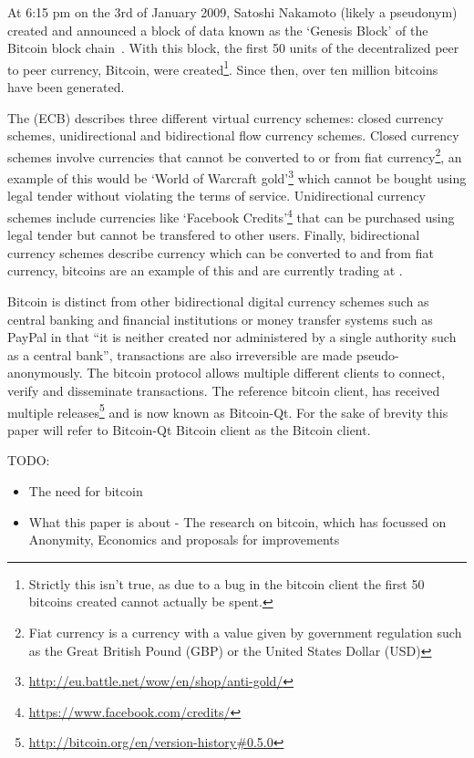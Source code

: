 At 6:15 pm on the 3rd of January 2009, Satoshi Nakamoto (likely a pseudonym) created and announced a block of data known as the `Genesis Block' of the Bitcoin block chain~\cite{satoshi}. With this block, the first 50 units of the decentralized peer to peer currency, Bitcoin, were created\footnote{Strictly this isn't true, as due to a bug in the bitcoin client the first 50 bitcoins created cannot actually be spent.}. Since then, over ten million bitcoins have been generated.

The \textcite{euro-currency-schemes} (ECB) describes three different virtual currency schemes: closed currency schemes, unidirectional and bidirectional flow currency schemes.  Closed currency schemes involve currencies that cannot be converted to or from fiat currency\footnote{Fiat currency is a currency with a value given by government regulation such as the Great British Pound (GBP) or the United States Dollar (USD)}, an example of this would be `World of Warcraft gold'\footnote{\url{http://eu.battle.net/wow/en/shop/anti-gold/}} which cannot be bought using legal tender without violating the terms of service.  Unidirectional currency schemes include currencies like `Facebook Credits'\footnote{\url{https://www.facebook.com/credits/}} that can be purchased using legal tender but cannot be transfered to other users.  Finally, bidirectional currency schemes describe currency which can be converted to and from fiat currency, bitcoins are an example of this and are currently trading at .

Bitcoin is distinct from other bidirectional digital currency schemes such as central banking and financial institutions or money transfer systems such as PayPal\cite{paypal} in that ``it is neither created nor administered by a single authority such as a central bank''\cite{why-interesting}, transactions are also irreversible are made pseudo-anonymously. The bitcoin protocol allows multiple different clients to connect, verify and disseminate transactions.  The reference bitcoin client, has received multiple releases\footnote{\url{http://bitcoin.org/en/version-history\#0.5.0}} and is now known as Bitcoin-Qt\cite{bitcoin-qt}. For the sake of brevity this paper will refer to Bitcoin-Qt Bitcoin client as the Bitcoin client.

TODO:
\begin{itemize} \item The need for bitcoin \item What this paper is about - The
    research on bitcoin, which has focussed on Anonymity, Economics and
    proposals for improvements \end{itemize}

